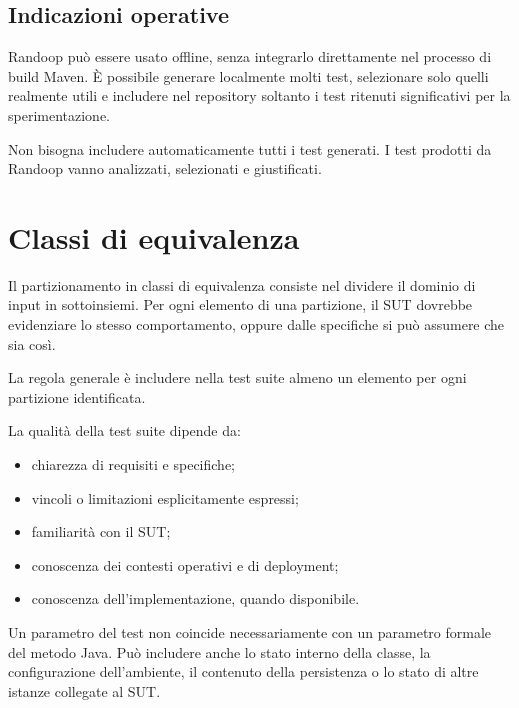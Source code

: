 \subsection{Indicazioni operative}

\begin{notaprof}
Randoop può essere usato offline, senza integrarlo direttamente nel processo di build Maven. È possibile generare localmente molti test, selezionare solo quelli realmente utili e includere nel repository soltanto i test ritenuti significativi per la sperimentazione.
\end{notaprof}

\begin{notaesame}
Non bisogna includere automaticamente tutti i test generati. I test prodotti da Randoop vanno analizzati, selezionati e giustificati.
\end{notaesame}

\section{Classi di equivalenza}

Il partizionamento in classi di equivalenza consiste nel dividere il dominio di input in sottoinsiemi. Per ogni elemento di una partizione, il SUT dovrebbe evidenziare lo stesso comportamento, oppure dalle specifiche si può assumere che sia così.

La regola generale è includere nella test suite almeno un elemento per ogni partizione identificata.

La qualità della test suite dipende da:

\begin{itemize}
    \item chiarezza di requisiti e specifiche;
    \item vincoli o limitazioni esplicitamente espressi;
    \item familiarità con il SUT;
    \item conoscenza dei contesti operativi e di deployment;
    \item conoscenza dell'implementazione, quando disponibile.
\end{itemize}

\begin{notaprof}
Un parametro del test non coincide necessariamente con un parametro formale del metodo Java. Può includere anche lo stato interno della classe, la configurazione dell'ambiente, il contenuto della persistenza o lo stato di altre istanze collegate al SUT.
\end{notaprof}

